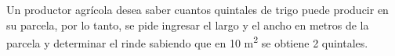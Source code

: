 Un productor agrícola desea saber cuantos quintales de trigo puede producir en su parcela, por lo tanto, se pide ingresar el largo y el ancho en metros de la parcela y determinar el rinde sabiendo que en 10 m\textsuperscript 2 se obtiene 2 quintales.

